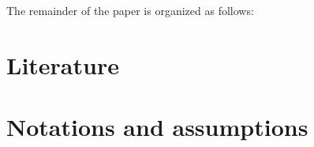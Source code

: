 \documentclass[preprint,12pt]{elsarticle}
\begin{document}

%


The remainder of the paper is organized as follows:





\section{Literature}

\section{Notations and assumptions}
\end{document}
